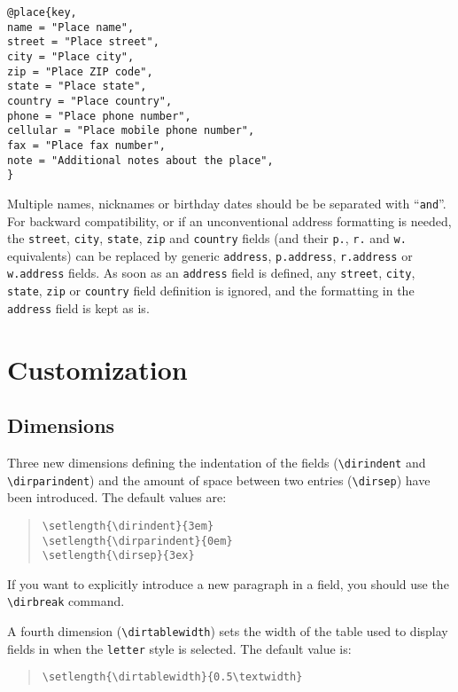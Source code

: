 \documentclass[10pt]{article}
\begin{document}
\begin{verbatim}
@place{key,
name = "Place name",
street = "Place street",
city = "Place city",
zip = "Place ZIP code",
state = "Place state",
country = "Place country",
phone = "Place phone number",
cellular = "Place mobile phone number",
fax = "Place fax number",
note = "Additional notes about the place",
}
\end{verbatim}

Multiple names, nicknames or birthday dates should be be separated with
``\texttt{and}''. For backward compatibility, or if an unconventional
address formatting is needed, the \texttt{street}, \texttt{city},
\texttt{state}, \texttt{zip} and \texttt{country} fields (and their
\texttt{p.}, \texttt{r.} and \texttt{w.} equivalents) can be replaced by
generic \texttt{address}, \texttt{p.address}, \texttt{r.address} or
\texttt{w.address} fields. As soon as an \texttt{address} field is defined,
any \texttt{street}, \texttt{city}, \texttt{state}, \texttt{zip} or
\texttt{country} field definition is ignored, and the formatting in the
\texttt{address} field is kept as is.

\section{Customization}
\label{sec:custom}

\subsection{Dimensions}

Three new dimensions defining the indentation of the fields (\verb'\dirindent'
and \verb'\dirparindent') and the amount of space between two entries
(\verb'\dirsep') have been introduced. The default values are:
\begin{quote}
\begin{verbatim}
\setlength{\dirindent}{3em}
\setlength{\dirparindent}{0em}
\setlength{\dirsep}{3ex}
\end{verbatim}
\end{quote}

If you want to explicitly introduce a new paragraph in a field, you
should use the \verb'\dirbreak' command.

A fourth dimension (\verb'\dirtablewidth') sets the width of the table used
to display fields in when the \texttt{letter} style is selected. The default
value is:
\begin{quote}
\begin{verbatim}
\setlength{\dirtablewidth}{0.5\textwidth}
\end{verbatim}
\end{quote}
\end{document}
